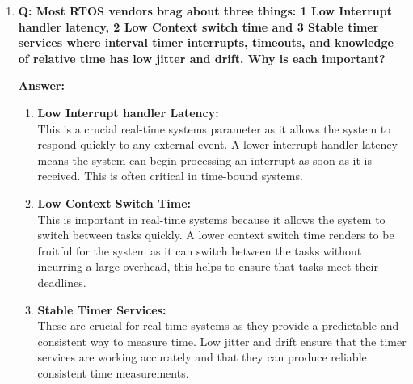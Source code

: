 \documentclass[a4paper,11pt]{article}%
\newenvironment{qanda}{\setlength{\parindent}{0pt}}{\bigskip}
\newcommand{\Q}{\bigskip\bfseries Q: }
\newcommand{\A}{\par\textbf{Answer: } \normalfont}
\begin{document}
\begin{qanda}
\begin{enumerate}
\begin{enumerate}
				\A 
				The RT-clock code is a simple program demonstrating the usage of POSIX real-time clock for measuring the time of execution of delay loop. Firstly, the program sets up the sleep time for a total of 3 secs and then enters a loop where it requests the specified time to sleep using the function – ‘nanosleep()’. The remaining sleep time is checked, if there is still time remaining, the process goes back to sleep. This particular process is repeated until the requested (expected) sleep time has been successfully met or until the maximum number of sleep calls has been reached. Now, the program calculates the difference between the requested and the actual sleep time and prints the results, at the end.\\

				clock\_gettime() function is used for acquiring the current time in nanoseconds from the POSIX real-time clock. It takes two arguments: clock ID and a pointer to the timespec structure. The clock ID specifies the clock to use and the pointer to the timespec structure is used for storing the current time.
				\item \Q Most RTOS vendors brag about three things: 1 Low Interrupt handler latency, 2 Low Context switch time and 3 Stable timer services where interval timer interrupts, timeouts, and knowledge of relative time has low jitter and drift. Why is each important?

				\A
				\begin{enumerate}
					\item \textbf{Low Interrupt handler Latency:}\\ This is a crucial real-time systems parameter as it allows the system to respond quickly to any external event. A lower interrupt handler latency means the system can begin processing an interrupt as soon as it is received. This is often critical in time-bound systems. 
					\item \textbf{Low Context Switch Time:}\\
					This is important in real-time systems because it allows the system to switch between tasks quickly. A lower context switch time renders to be fruitful for the system as it can switch between the tasks without incurring a large overhead, this helps to ensure that tasks meet their deadlines.
					\item \textbf{Stable Timer Services:}\\
					These are crucial for real-time systems as they provide a predictable and consistent way to measure time. Low jitter and drift ensure that the timer services are working accurately and that they can produce reliable consistent time measurements. 
				\end{enumerate}


\end{enumerate}
\end{enumerate}
\end{qanda}
\end{document}
